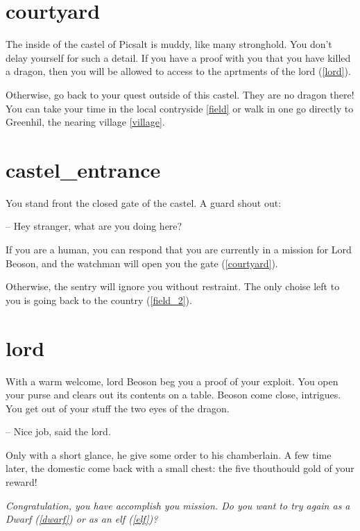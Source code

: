 \section{courtyard}

The inside of the castel of Picsalt is muddy, like many stronghold. You don't
delay yourself for such a detail. If you have a proof with you that you have
killed a dragon, then you will be allowed to access to the aprtments of the lord
(\ref{lord}).

Otherwise, go back to your quest outside of this castel. They are no dragon
there! You can take your time in the local contryside \ref{field} or walk in
one go directly to Greenhil, the nearing village \ref{village}.

\section{castel_entrance}

You stand front the closed gate of the castel. A guard shout out:

-- Hey stranger, what are you doing here?

If you are a human, you can respond that you are currently in a mission for Lord
Beoson, and the watchman will open you the gate (\ref{courtyard}).

Otherwise, the sentry will ignore you without restraint. The only choise
left to you is going back to the country (\ref{field_2}).

\section{lord}

With a warm welcome, lord Beoson beg you a proof of your exploit.  You open
your purse and clears out its contents on a table. Beoson come close,
intrigues. You get out of your stuff the two eyes of the dragon.

-- Nice job, said the lord.

Only with a short glance, he give some order to his chamberlain. A few time
later, the domestic come back with a small chest: the five thouthould gold of
your reward!

\textit{Congratulation, you have accomplish you mission. Do you want to try again as a
Dwarf (\ref{dwarf}) or as an elf (\ref{elf})?}
